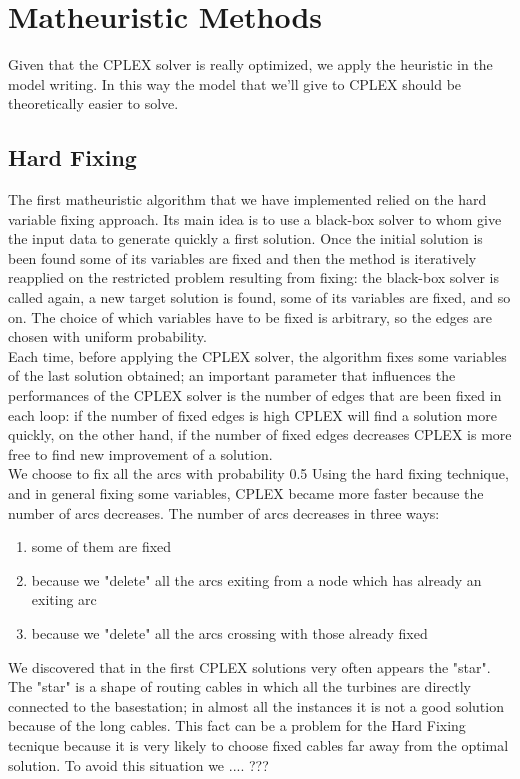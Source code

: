 
\chapter{Matheuristic Methods}
\label{chp:4-Matheuristics}
Given that the \textsc{CPLEX} solver is really optimized, we apply the heuristic in the model writing. In this way the model that we’ll give to \textsc{CPLEX} should be theoretically easier to solve.

\section{Hard Fixing}
The first matheuristic algorithm that we have implemented relied on the hard variable fixing approach. Its main idea is to use a black-box solver to whom give the input data to generate quickly a first solution. Once the initial solution is been found some of its variables are fixed and then the method is iteratively reapplied on the restricted problem resulting from fixing: the black-box solver is called again, a new target solution is found, some of its variables are fixed, and so on. The choice of which variables have to be fixed is arbitrary, so the edges are chosen with uniform probability.\\
Each time, before applying the \textsc{CPLEX} solver, the algorithm fixes some variables of the last solution obtained; an important parameter that influences the performances of the \textsc{CPLEX} solver is the number of edges that are been fixed in each loop: if the number of fixed edges is high \textsc{CPLEX} will find a solution more quickly, on the other hand, if the number of fixed edges decreases \textsc{CPLEX} is more free to find new improvement of a solution. \\
We choose to fix all the arcs with probability 0.5 
Using the hard fixing technique, and in general fixing some variables, \textsc{CPLEX} became more faster because the number of arcs decreases. The number of arcs decreases in three ways: 
\begin{enumerate}
\item some of them are fixed
\item because we "delete" all the arcs exiting from a node which has already an exiting arc
\item because we "delete" all the arcs crossing with those already fixed 
\end{enumerate}
We discovered that in the first \textsc{CPLEX} solutions very often appears the "star". The "star" is a shape of routing cables in which all the turbines are directly connected to the basestation; in almost all the instances it is not a good solution because of the long cables. This fact can be a problem for the Hard Fixing tecnique because it is very likely to choose fixed cables far away from the optimal solution. To avoid this situation we .... ??? \\ 
